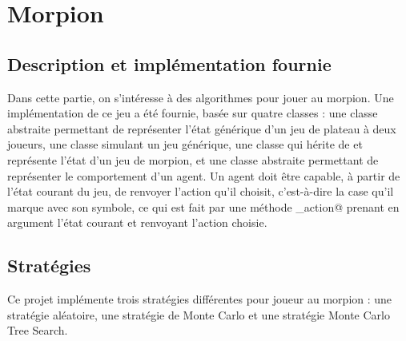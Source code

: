 \documentclass[a4paper,12pt]{article}
\begin{document}
\section{Morpion}
\label{SecMorpion}

\subsection{Description et implémentation fournie}

Dans cette partie, on s'intéresse à des algorithmes pour jouer au morpion. Une implémentation de ce jeu a été fournie, basée sur quatre classes : une classe abstraite \verb@State@ permettant de représenter l'état générique d'un jeu de plateau à deux joueurs, une classe \verb@Jeu@ simulant un jeu générique, une classe \verb@MorpionState@ qui hérite de \verb@State@ et représente l'état d'un jeu de morpion, et une classe abstraite \verb@Agent@ permettant de représenter le comportement d'un agent. Un agent doit être capable, à partir de l'état courant du jeu, de renvoyer l'action qu'il choisit, c'est-à-dire la case qu'il marque avec son symbole, ce qui est fait par une méthode \verb@get_action@ prenant en argument l'état courant \verb@state@ et renvoyant l'action choisie.

\subsection{Stratégies}

Ce projet implémente trois stratégies différentes pour joueur au morpion : une stratégie aléatoire, une stratégie de Monte Carlo et une stratégie Monte Carlo Tree Search.
\end{document}
